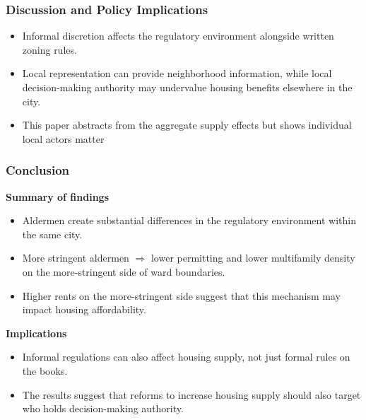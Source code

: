 \begin{frame}
    \frametitle{Discussion and Policy Implications}
    \begin{itemize}[itemsep=0.65em]
      \item Informal discretion affects the regulatory environment alongside written zoning rules.
      \item Local representation can provide neighborhood information, while local decision-making authority may undervalue housing benefits elsewhere in the city.
      \item This paper abstracts from the aggregate supply effects but shows individual local actors matter 
    \end{itemize}
\end{frame}

\begin{frame}
    \frametitle{Conclusion}
    \textbf{Summary of findings}
    \begin{itemize}[itemsep=0.25em,topsep=0.2em,parsep=0pt,partopsep=0pt]
      \item Aldermen create substantial differences in the regulatory environment within the same city.
      \item More stringent aldermen $\Rightarrow$ lower permitting and lower multifamily density on the more-stringent side of ward boundaries.
      \item Higher rents on the more-stringent side suggest that this mechanism may impact housing affordability.
    \end{itemize}

    \vspace{0.4em}
    \textbf{Implications}
    \begin{itemize}[itemsep=0.25em,topsep=0.2em,parsep=0pt,partopsep=0pt]
      \item Informal regulations can also affect housing supply, not just formal rules on the books.
      \item The results suggest that reforms to increase housing supply should also target who holds decision-making authority.
    \end{itemize}
\end{frame}
